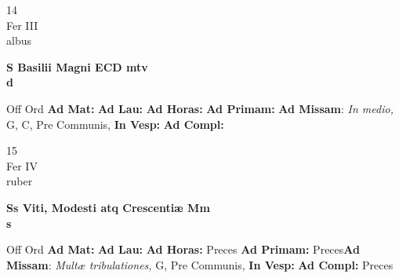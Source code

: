 \documentclass[10pt, openany]{book}
\begin{document}
        \begin{center}
            \begin{minipage}{3.5in}
                \vspace{2em}
                \begin{minipage}{0.5in}
                    {\Huge 14} \\
                    {\normalsize Fer III} \\
                    {\normalsize albus}
                \end{minipage}
                \begin{minipage}{3.0in}
                    \textbf{ \large S Basilii Magni ECD mtv \\
                    \textnormal{\normalsize d}} \\ 
                \end{minipage}
                \begin{justify}Off Ord
                    \textbf{Ad Mat: }
                    \textbf{Ad Lau: }
                    \textbf{Ad Horas: }
                    \textbf{Ad Primam: }\textbf{Ad Missam}: \textit{In medio,} G, C, Pre Communis,  
                    \textbf{In Vesp: }
                    \textbf{Ad Compl: }
                \end{justify}
            \end{minipage}
        \end{center}
    
        \begin{center}
            \begin{minipage}{3.5in}
                \vspace{2em}
                \begin{minipage}{0.5in}
                    {\Huge 15} \\
                    {\normalsize Fer IV} \\
                    {\normalsize ruber}
                \end{minipage}
                \begin{minipage}{3.0in}
                    \textbf{ \large Ss Viti, Modesti atq Crescentiæ Mm \\
                    \textnormal{\normalsize s}} \\ 
                \end{minipage}
                \begin{justify}Off Ord
                    \textbf{Ad Mat: }
                    \textbf{Ad Lau: }
                    \textbf{Ad Horas: }Preces
                    \textbf{Ad Primam: }Preces\textbf{Ad Missam}: \textit{Multæ tribulationes,} G, Pre Communis,  
                    \textbf{In Vesp: }
                    \textbf{Ad Compl: }Preces
                \end{justify}
            \end{minipage}
        \end{center}
    
\end{document}
